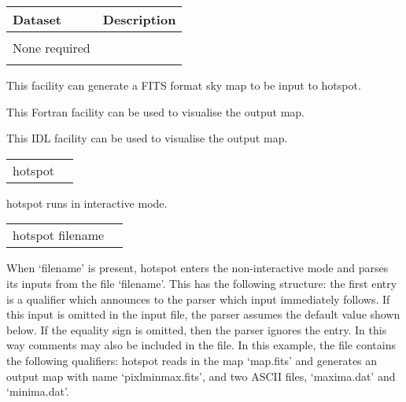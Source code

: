 \begin{datasets}
{
\begin{tabular}{p{0.3\hsize} p{0.35\hsize}} \hline  
  \textbf{Dataset} & \textbf{Description} \\ \hline
                   &                      \\ %
  None required & \\ 
                   &                      \\ \hline %
\end{tabular}
} 
\end{datasets}

\begin{support}
  \begin{sulist}{} %
  \item[\htmlref{synfast}{fac:synfast}] This \healpix facility can generate a FITS format 
            sky map to be input to hotspot.
  \item[\htmlref{map2gif}{fac:map2gif}] This \healpix Fortran facility can be used to visualise the
  output map.
  \item[\htmlref{mollview}{idl:mollview}] This \healpix IDL facility can be used to visualise the
  output map.
  \end{sulist}
\end{support}

\begin{examples}{1}
{
\begin{tabular}{ll} %
hotspot  \\
\end{tabular}
}
{
hotspot runs in interactive mode.
}
\end{examples}

\vfill\newpage

\begin{examples}{2}
{
\begin{tabular}{ll} %
hotspot  filename \\
\end{tabular}
}
{When `filename' is present, hotspot enters the non-interactive mode and parses
its inputs from the file `filename'. This has the following
structure: the first entry is a qualifier which announces to the parser
which input immediately follows. If this input is omitted in the
input file, the parser assumes the default value shown below.
If the equality sign is omitted, then the parser ignores the entry.
In this way comments may also be included in the file.
In this example, the file contains the following qualifiers:\hfill\newline
{}
hotspot reads in the map `map.fits' and generates
an output map with name `pixlminmax.fits', and two ASCII files,
`maxima.dat' and
`minima.dat'.
}
\end{examples}

